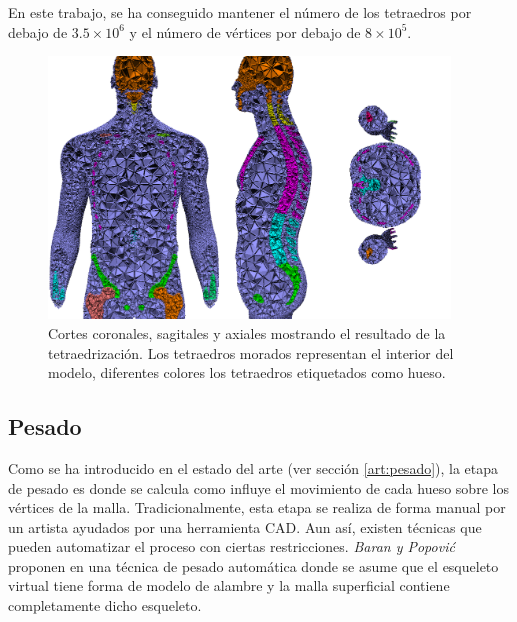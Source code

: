En este trabajo, se ha conseguido mantener el número de los tetraedros por debajo de $3.5\times 10^6$ y el número de vértices por debajo de $8 \times 10^5$. 
%
\begin{figure}[th]
   \centering
    \includegraphics[width=0.95\textwidth]{IMG/boneid.png}
     \caption{Cortes coronales, sagitales y axiales mostrando el resultado de la tetraedrización. Los tetraedros morados representan el interior del modelo,   diferentes colores los tetraedros etiquetados como hueso.}
\label{fig:tetra}
\end{figure} 

\subsection{Pesado}
\label{posing:Pesado}
%
Como se ha introducido en el estado del arte (ver sección \ref{art:pesado}), la etapa de pesado es donde se calcula como influye el movimiento de cada hueso sobre los vértices de la malla.
Tradicionalmente, esta etapa se realiza de forma manual por un artista ayudados por una herramienta  \ac{CAD}. Aun así, existen técnicas que pueden automatizar el proceso con ciertas restricciones. \emph{Baran y Popovi\'{c}} proponen en \cite{Baran:2007}\del{,} una técnica de pesado automática donde se asume que el esqueleto virtual tiene forma de modelo de alambre y la malla superficial contiene completamente dicho esqueleto.

